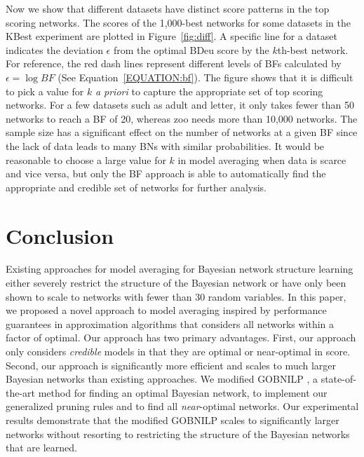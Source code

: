 \documentclass[letterpaper]{article}
\begin{document}
Now we show that different datasets have distinct score patterns in the top scoring networks. The scores of the 1,000-best networks for some datasets in the KBest experiment are plotted in Figure~\ref{fig:diff}. A specific line for a dataset indicates the deviation $\epsilon$ from the optimal BDeu score by the $k$th-best network. For reference, the red dash lines represent different levels of BFs calculated by $\epsilon=\log{BF}$ (See Equation~\ref{EQUATION:bf}). The figure shows that it is difficult to pick a value for $k$ \emph{a priori} to capture the appropriate set of top scoring networks. For a few datasets such as adult and letter, it only takes fewer than 50 networks to reach a BF of 20, whereas zoo needs more than 10,000 networks. The sample size has a significant effect on the number of networks at a given BF since the lack of data leads to many BNs with similar probabilities. It would be reasonable to choose a large value for $k$ in model averaging when data is scarce and vice versa, but only the BF approach is able to automatically find the appropriate and credible set of networks for further analysis.

\section{Conclusion}\label{sec:conclusion}

Existing approaches for model averaging for Bayesian network structure learning
either severely restrict the structure of the Bayesian network
or have only been shown to scale to networks with fewer than 30 random
variables. In this paper, we proposed a novel approach to model
averaging inspired by performance guarantees in approximation
algorithms that considers all networks within a factor of optimal.
Our approach has two primary advantages. First,
our approach only considers \emph{credible} models in that they
are optimal or near-optimal in score. Second, our approach
is significantly more efficient and scales to much larger
Bayesian networks than existing approaches.
We modified GOBNILP \cite{BartlettC13}, a state-of-the-art method for finding
an optimal Bayesian network, to implement our generalized pruning rules
and to find all \emph{near}-optimal networks. Our experimental results demonstrate
that the modified GOBNILP scales to significantly
larger networks without resorting to restricting the structure
of the Bayesian networks that are learned.
\end{document}
